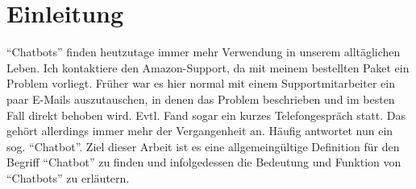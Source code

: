 \chapter{Einleitung} %
\label{cha:Einleitung}

“Chatbots” finden heutzutage immer mehr Verwendung in unserem alltäglichen Leben. Ich kontaktiere den Amazon-Support, da mit meinem bestellten Paket ein Problem vorliegt. Früher war es hier normal mit einem Supportmitarbeiter ein paar E-Mails auszutauschen, in denen das Problem beschrieben und im besten Fall direkt behoben wird. Evtl. Fand sogar ein kurzes Telefongespräch statt. Das gehört allerdings immer mehr der Vergangenheit an. Häufig antwortet nun ein sog. “Chatbot”. 
Ziel dieser Arbeit ist es eine allgemeingültige Definition für den Begriff “Chatbot” zu finden und infolgedessen die Bedeutung und Funktion von “Chatbots” zu erläutern.

